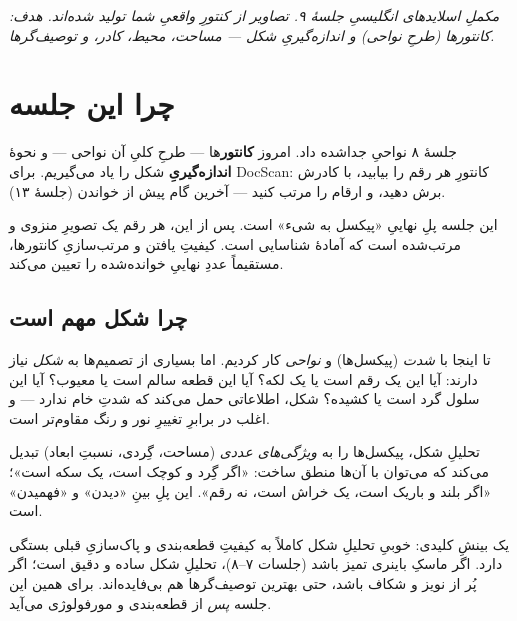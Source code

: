 \documentclass[12pt,a4paper]{article}
\begin{document}

{\small\itshape مکملِ اسلایدهای انگلیسیِ جلسهٔ ۹. تصاویر از کنتورِ واقعیِ شما تولید شده‌اند. هدف: کانتورها (طرحِ نواحی) و اندازه‌گیریِ شکل — مساحت، محیط، کادر، و توصیف‌گرها.}

\vspace{0.5cm}
\tableofcontents
\vspace{1cm}

\section{چرا این جلسه}

جلسهٔ ۸ نواحیِ جداشده داد. امروز \textbf{کانتور}‌ها — طرحِ کلیِ آن نواحی — و نحوهٔ \textbf{اندازه‌گیریِ}
شکل را یاد می‌گیریم. برای DocScan: کانتورِ هر رقم را بیابید، با کادرش برش دهید، و ارقام را مرتب
کنید — آخرین گام پیش از خواندن (جلسهٔ ۱۳).

\begin{nokte}
این جلسه پلِ نهاییِ «پیکسل به شیء» است. پس از این، هر رقم یک تصویرِ منزوی و مرتب‌شده است که آمادهٔ
شناسایی است. کیفیتِ یافتن و مرتب‌سازیِ کانتورها، مستقیماً عددِ نهاییِ خوانده‌شده را تعیین می‌کند.
\end{nokte}

\subsection{چرا شکل مهم است}

تا اینجا با \emph{شدت} (پیکسل‌ها) و \emph{نواحی} کار کردیم. اما بسیاری از تصمیم‌ها به \emph{شکل}
نیاز دارند: آیا این یک رقم است یا یک لکه؟ آیا این قطعه سالم است یا معیوب؟ آیا این سلول گرد است یا
کشیده؟ شکل، اطلاعاتی حمل می‌کند که شدتِ خام ندارد — و اغلب در برابرِ تغییرِ نور و رنگ مقاوم‌تر است.

تحلیلِ شکل، پیکسل‌ها را به \emph{ویژگی‌های عددی} (مساحت، گِردی، نسبتِ ابعاد) تبدیل می‌کند که
می‌توان با آن‌ها منطق ساخت: «اگر گِرد و کوچک است، یک سکه است»؛ «اگر بلند و باریک است، یک خراش
است، نه رقم». این پلِ بینِ «دیدن» و «فهمیدن» است.

\begin{nokte}
یک بینشِ کلیدی: خوبیِ تحلیلِ شکل کاملاً به کیفیتِ قطعه‌بندی و پاک‌سازیِ قبلی بستگی دارد. اگر ماسکِ
باینری تمیز باشد (جلسات ۷–۸)، تحلیلِ شکل ساده و دقیق است؛ اگر پُر از نویز و شکاف باشد، حتی
بهترین توصیف‌گرها هم بی‌فایده‌اند. برای همین این جلسه \emph{پس} از قطعه‌بندی و مورفولوژی می‌آید.
\end{nokte}
\end{document}
